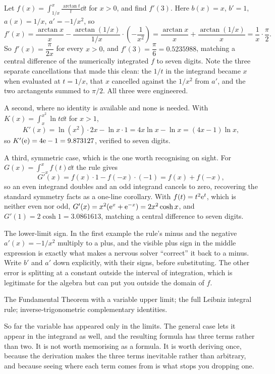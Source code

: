 \begin{worked}
Let $f(x)=\displaystyle\int_{1/x}^{x}\frac{\arctan t}{t}\dd t$ for $x>0$, and find $f'(3)$. Here $b(x)=x$, $b'=1$, $a(x)=1/x$, $a'=-1/x^{2}$, so
\[
f'(x)=\frac{\arctan x}{x}-\frac{\arctan(1/x)}{1/x}\cdot\left(-\frac{1}{x^{2}}\right)
=\frac{\arctan x}{x}+\frac{\arctan(1/x)}{x}=\frac{1}{x}\cdot\frac{\pi}{2}.
\]
So $f'(x)=\dfrac{\pi}{2x}$ for every $x>0$, and $f'(3)=\dfrac{\pi}{6}=0.5235988$, matching a central difference of the numerically integrated $f$ to seven digits. Note the three separate cancellations that made this clean: the $1/t$ in the integrand became $x$ when evaluated at $t=1/x$, that $x$ cancelled against the $1/x^{2}$ from $a'$, and the two arctangents summed to $\pi/2$. All three were engineered.

A second, where no identity is available and none is needed. With $K(x)=\displaystyle\int_{x}^{x^{2}}\ln t\dd t$ for $x>1$,
\[
K'(x)=\ln(x^{2})\cdot2x-\ln x\cdot1=4x\ln x-\ln x=(4x-1)\ln x ,
\]
so $K'(\mathrm{e})=4\mathrm{e}-1=9.873127$, verified to seven digits.

A third, symmetric case, which is the one worth recognising on sight. For $G(x)=\displaystyle\int_{-x}^{x}f(t)\dd t$ the rule gives
\[
G'(x)=f(x)\cdot1-f(-x)\cdot(-1)=f(x)+f(-x),
\]
so an even integrand doubles and an odd integrand cancels to zero, recovering the standard symmetry facts as a one-line corollary. With $f(t)=t^{2}\mathrm{e}^{t}$, which is neither even nor odd, $G'(x)=x^{2}(\mathrm{e}^{x}+\mathrm{e}^{-x})=2x^{2}\cosh x$, and $G'(1)=2\cosh1=3.0861613$, matching a central difference to seven digits.
\end{worked}

\begin{trap}
The lower-limit sign. In the first example the rule's minus and the negative $a'(x)=-1/x^{2}$ multiply to a plus, and the visible plus sign in the middle expression is exactly what makes a nervous solver ``correct'' it back to a minus. Write $b'$ and $a'$ down explicitly, with their signs, before substituting. The other error is splitting at a constant outside the interval of integration, which is legitimate for the algebra but can put you outside the domain of $f$.
\end{trap}

\begin{seealsob}The Fundamental Theorem with a variable upper limit; the full Leibniz integral rule; inverse-trigonometric complementary identities.\end{seealsob}

So far the variable has appeared only in the limits. The general case lets it appear in the integrand as well, and the resulting formula has three terms rather than two. It is not worth memorising as a formula. It is worth deriving once, because the derivation makes the three terms inevitable rather than arbitrary, and because seeing where each term comes from is what stops you dropping one.

